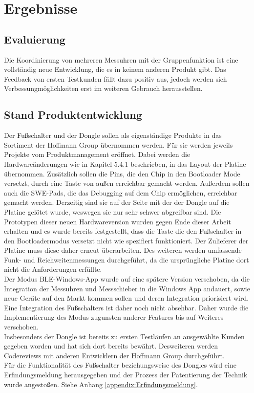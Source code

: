 \section{Ergebnisse}

\subsection{Evaluierung}
Die Koordinierung von mehreren Messuhren mit der Gruppenfunktion ist eine vollständig neue Entwicklung, die es in keinem anderen Produkt gibt. Das Feedback von ersten Testkunden fällt dazu positiv aus, jedoch werden sich Verbessungmöglichkeiten erst im weiteren Gebrauch herausstellen.


\subsection{Stand Produktentwicklung}
Der Fußschalter und der Dongle sollen als eigenständige Produkte in das Sortiment der Hoffmann Group übernommen werden. Für sie werden jeweils Projekte vom Produktmanagement eröffnet. Dabei werden die Hardwareänderungen wie in Kapitel 5.4.1 beschrieben, in das Layout der Platine übernommen. Zusätzlich sollen die Pins, die den Chip in den Bootloader Mode versetzt, durch eine Taste von außen erreichbar gemacht werden. Außerdem sollen auch die SWE-Pads, die das Debugging auf dem Chip ermöglichen, erreichbar gemacht werden. Derzeitig sind sie auf der Seite mit der der Dongle auf die Platine gelötet wurde, weswegen sie nur sehr schwer abgreifbar sind. Die Prototypen dieser neuen Hardwareversion wurden gegen Ende dieser Arbeit erhalten und es wurde bereits festgestellt, dass die Taste die den Fußschalter in den Bootloadermodus versetzt nicht wie spezifiert funktioniert. Der Zulieferer der Platine muss diese daher erneut überarbeiten. Des weiteren werden umfassende Funk- und Reichweitenmessungen durchgeführt, da die ursprüngliche Platine dort nicht die Anforderungen erfüllte.\\
Der Modus \ac{BLE}-Windows-App wurde auf eine spätere Version verschoben, da die Integration der Messuhren und Messschieber in die Windows App andauert, sowie neue Geräte auf den Markt kommen sollen und deren Integration priorisiert wird. Eine Integration des Fußschalters ist daher noch nicht absehbar. Daher wurde die Implementierung des Modus zugunsten anderer Features bis auf Weiteres verschoben.\\
Insbesonders der Dongle ist bereits zu ersten Testläufen an ausgewählte Kunden gegeben worden und hat sich dort bereits bewährt. Desweiteren werden Codereviews mit anderen Entwicklern der Hoffmann Group durchgeführt.\\
Für die Funktionalität des Fußschalter beziehungsweise des Dongles wird eine Erfindungsmeldung herausgegeben und der Prozess der Patentierung der Technik wurde angestoßen. Siehe Anhang \ref{appendix:Erfindungsmeldung}.
